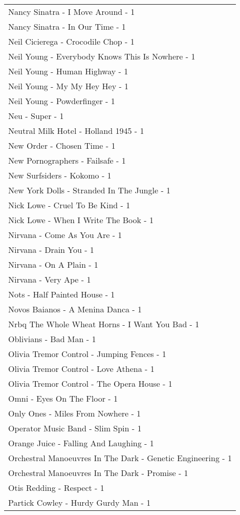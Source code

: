 \documentclass[
]{article}
\begin{document}
\begin{longtable}{l}
Nancy Sinatra - I Move Around - 1 \\ 
Nancy Sinatra - In Our Time - 1 \\ 
Neil Cicierega - Crocodile Chop - 1 \\ 
Neil Young - Everybody Knows This Is Nowhere - 1 \\ 
Neil Young - Human Highway - 1 \\ 
Neil Young - My My Hey Hey - 1 \\ 
Neil Young - Powderfinger - 1 \\ 
Neu - Super - 1 \\ 
Neutral Milk Hotel - Holland 1945 - 1 \\ 
New Order - Chosen Time - 1 \\ 
New Pornographers - Failsafe - 1 \\ 
New Surfsiders - Kokomo - 1 \\ 
New York Dolls - Stranded In The Jungle - 1 \\ 
Nick Lowe - Cruel To Be Kind - 1 \\ 
Nick Lowe - When I Write The Book - 1 \\ 
Nirvana - Come As You Are - 1 \\ 
Nirvana - Drain You - 1 \\ 
Nirvana - On A Plain - 1 \\ 
Nirvana - Very Ape - 1 \\ 
Nots - Half Painted House - 1 \\ 
Novos Baianos - A Menina Danca - 1 \\ 
Nrbq The Whole Wheat Horns - I Want You Bad - 1 \\ 
Oblivians - Bad Man - 1 \\ 
Olivia Tremor Control - Jumping Fences - 1 \\ 
Olivia Tremor Control - Love Athena - 1 \\ 
Olivia Tremor Control - The Opera House - 1 \\ 
Omni - Eyes On The Floor - 1 \\ 
Only Ones - Miles From Nowhere - 1 \\ 
Operator Music Band - Slim Spin - 1 \\ 
Orange Juice - Falling And Laughing - 1 \\ 
Orchestral Manoeuvres In The Dark - Genetic Engineering - 1 \\ 
Orchestral Manoeuvres In The Dark - Promise - 1 \\ 
Otis Redding - Respect - 1 \\ 
Partick Cowley - Hurdy Gurdy Man - 1 \\ 

\end{longtable}
\end{document}
